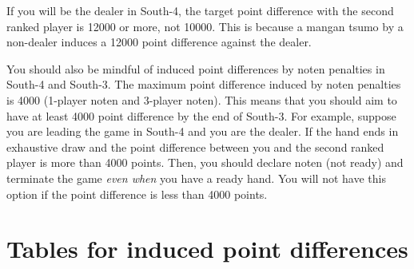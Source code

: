 \bigskip
If you will be the dealer in South-4, the target point difference with the second ranked player is 12000 or more, not 10000. This is because a {\jap mangan tsumo} by a non-dealer induces a 12000 point difference against the dealer. 

\bigskip
You should also be mindful of induced point differences by {\jap noten} penalties in South-4 and South-3. The maximum point difference induced by {\jap noten} penalties is 4000 (1-player {\jap noten} and 3-player {\jap noten}). This means that you should aim to have at least 4000 point difference by the end of South-3. 
For example, suppose you are leading the game in South-4 and you are the dealer. If the hand ends in exhaustive draw and the point difference between you and the second ranked player is more than 4000 points. Then, you should declare {\jap noten} (not ready) and terminate the game \emph{even when} you have a ready hand. You will not have this option if the point difference is less than 4000 points. 

\newpage

\section{Tables for induced point differences}

